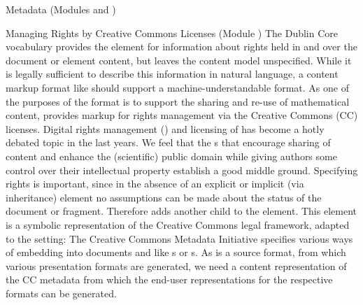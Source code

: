 \begin{tchapter}[id=metadata,short=Metadata]{Metadata (Modules {} and  {})}
\begin{tsection}[id=creativecommons,short=Managing Rights]{Managing Rights by Creative
    Commons Licenses (Module {})}
  The Dublin Core vocabulary provides the {} element for
  information about rights held in and over the document or element content, but leaves
  the content model unspecified. While it is legally sufficient to describe this
  information in natural language, a content markup format like {\omdoc} should support a
  machine-understandable format. As one of the purposes of the {\omdoc} format is to
  support the sharing and re-use of mathematical content, {\omdoc} provides markup for
  rights management via the {Creative Commons}
  (CC{}) licenses.  Digital rights
  management () and licensing of
  {} has become a hotly debated topic in the last
  years. We feel that the {s} that encourage sharing of
  content and enhance the (scientific) public domain while giving authors some control
  over their intellectual property establish a good middle ground. Specifying rights is
  important, since in the absence of an explicit or implicit (via inheritance)
  {} element no assumptions can be made about the status of the
  document or fragment.  Therefore {\omdoc} adds another child to the {}
  element.  This {} element is a symbolic representation of the
  Creative Commons legal framework, adapted to the {\omdoc} setting: The Creative Commons
  Metadata Initiative specifies various ways of embedding {} into
  documents and {} like {s} or
  {s}. As {\omdoc} is a source format, from which various
  presentation formats are generated, we need a content representation of the CC metadata
  from which the end-user representations for the respective formats can be generated.


\end{tsection}
\end{tchapter}

